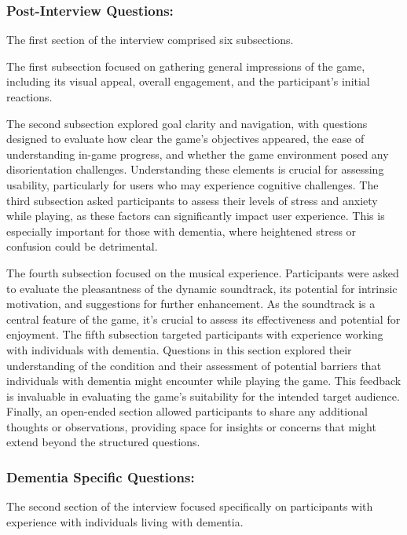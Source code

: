\documentclass{l4proj}
\begin{document}
\subsubsection{Post-Interview Questions:}
The first section of the interview comprised six subsections. 

The first subsection focused on gathering general impressions of the game, including its visual appeal, overall engagement, and the participant's initial reactions.  %

The second subsection explored goal clarity and navigation, with questions designed to evaluate how clear the game's objectives appeared, the ease of understanding in-game progress, and whether the game environment posed any disorientation challenges.  Understanding these elements is crucial for assessing usability,  particularly for users who may experience cognitive challenges.  The third subsection asked participants to assess their levels of stress and anxiety while playing, as these factors can significantly impact user experience. This is especially important for those with dementia, where heightened stress or confusion could be detrimental.

The fourth subsection focused on the musical experience. Participants were asked to evaluate the pleasantness of the dynamic soundtrack, its potential for intrinsic motivation, and suggestions for further enhancement. As the soundtrack is a central feature of the game, it's crucial to assess its effectiveness and potential  for enjoyment.  The fifth subsection targeted participants with experience working with individuals with dementia. Questions in this section explored their understanding of the condition and their assessment of potential barriers that individuals with dementia might encounter while playing the game.  This feedback is invaluable in evaluating the game's suitability for the intended target audience.  Finally, an open-ended section allowed participants to share any additional thoughts or observations, providing space for insights or concerns that might extend beyond the structured questions.

\subsubsection{Dementia Specific Questions:}
The second section of the interview focused specifically on participants with experience with individuals living with dementia. 
\end{document}
